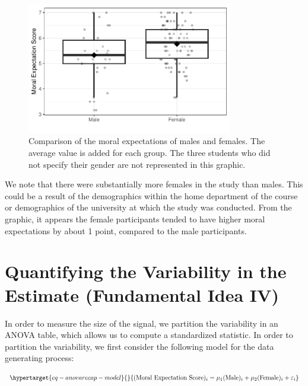 \documentclass[
  letterpaper,
  DIV=11,
  numbers=noendperiod]{scrreprt}
\theoremstyle{definition}
\theoremstyle{definition}
\theoremstyle{plain}
\theoremstyle{remark}
\begin{document}
\begin{figure}

{\centering \includegraphics[width=0.8\textwidth,height=\textheight]{./images/fig-anovarecap-boxplot-1.pdf}

}

\caption{\label{fig-anovarecap-boxplot}Comparison of the moral
expectations of males and females. The average value is added for each
group. The three students who did not specify their gender are not
represented in this graphic.}

\end{figure}

We note that there were substantially more females in the study than
males. This could be a result of the demographics within the home
department of the course or demographics of the university at which the
study was conducted. From the graphic, it appears the female
participants tended to have higher moral expectations by about 1 point,
compared to the male participants.

\hypertarget{quantifying-the-variability-in-the-estimate-fundamental-idea-iv-1}{%
\section{Quantifying the Variability in the Estimate (Fundamental Idea
IV)}\label{quantifying-the-variability-in-the-estimate-fundamental-idea-iv-1}}

In order to measure the size of the signal, we partition the variability
in an ANOVA table, which allows us to compute a standardized statistic.
In order to partition the variability, we first consider the following
model for the data generating process:

\begin{equation}\protect\hypertarget{eq-anovarecap-model}{}{(\text{Moral Expectation Score})_i = \mu_1(\text{Male})_i + \mu_2 (\text{Female})_i + \varepsilon_i}\label{eq-anovarecap-model}\end{equation}
\end{document}
